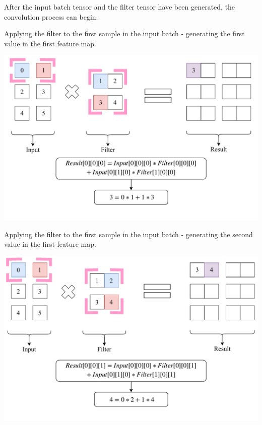 \documentclass[a4paper, 12pt]{report}
\begin{document}
\newpage
After the input batch tensor and the filter tensor have been generated, the convolution process can begin.\\
\begin{blockfigure}{ Applying the filter to the first sample in the input batch - generating the first value in the first feature map.}
	\begin{center}
		\includegraphics[width=\textwidth]{firstConvSample_step1}
	\end{center}
\end{blockfigure}
\begin{blockfigure}{ Applying the filter to the first sample in the input batch - generating the second value in the first feature map.}
	\begin{center}
		\includegraphics[width=\textwidth]{firstConvSample_step2}
	\end{center}
\end{blockfigure}
\newpage
\end{document}
